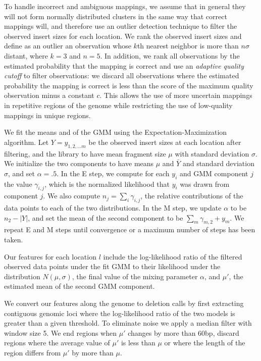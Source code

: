 \documentclass[11pt]{article}
\begin{document}
\begin{description}
To handle incorrect and ambiguous mappings, we assume that in general they will not form normally distributed clusters in the same way that correct mappings will, and therefore use an outlier detection technique to filter the observed insert sizes for each location. We rank the observed insert sizes and define as an outlier an observation whose $k$th nearest neighbor is more than $n\sigma$ distant, where $k = 3$ and $n = 5$. In addition, we rank all observations by the estimated probability that the mapping is correct and use an \emph{adaptive quality cutoff} to filter observations: we discard all observations where the estimated probability the mapping is correct is less than the score of the maximum quality observation minus a constant $c$. This allows the use of more uncertain mappings in repetitive regions of the genome while restricting the use of low-quality mappings in unique regions.

We fit the means and of the GMM using the Expectation-Maximization algorithm. Let $Y = y_{1,2, \ldots m}$ be the observed insert sizes at each location after filtering, and the library to have mean fragment size $\mu$ with standard deviation $\sigma$. We initialize the two components to have means $\mu$ and $\bar{Y}$ and standard deviation $\sigma$, and set $\alpha = .5$. In the E step, we compute for each $y_i$ and GMM component $j$ the value $\gamma_{i,j}$, which is the normalized likelihood that $y_i$ was drawn from component $j$. We also compute $n_j = \sum_i{\gamma_{i,j}}$, the relative contributions of the data points to each of the two distributions. In the M step, we update $\alpha$ to be $n_2 - \left|Y\right|$, and set the mean of the second component to be $\sum_m{\gamma_{m,2} + y_m}$. We repeat E and M steps until convergence or a maximum number of steps has been taken.

Our features for each location $l$ include the log-likelihood ratio of the filtered observed data points under the fit GMM to their likelihood under the distribution $N(\mu,\sigma)$, the final value of the mixing parameter $\alpha$, and $\mu'$, the estimated mean of the second GMM component.

\item[\sc{PostProcess}] We convert our features along the genome to deletion calls by first extracting contiguous genomic loci where the log-likelihood ratio of the two models is greater than a given threshold. To eliminate noise we apply a median filter with window size 5. We end regions when $\mu'$ changes by more than 60bp, discard regions where the average value of $\mu'$ is less than $\mu$ or where the length of the region differs from $\mu'$ by more than $\mu$.
\end{description}
\end{document}
